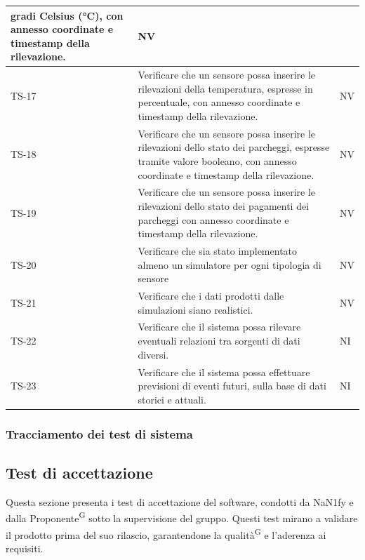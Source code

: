 \documentclass[8pt]{article}
\newcommand{\glossterm}[1]{#1\textsuperscript{G}} %
\begin{document}
\begin{longtable}{|>{\centering}p{2cm}|>{\RaggedRight}m{12cm}|>{\centering\arraybackslash}p{2cm}|}
    gradi Celsius (°C), con annesso coordinate e timestamp della rilevazione. & NV \\
    \hline
    TS-17 & Verificare che un sensore possa inserire le rilevazioni della temperatura, espresse in
    percentuale, con annesso coordinate e timestamp della rilevazione. & NV \\
    \hline 
    TS-18 & Verificare che un sensore possa inserire le rilevazioni dello stato dei parcheggi,
    espresse tramite valore booleano, con annesso coordinate e timestamp della rilevazione. & NV \\
    \hline 
    TS-19 & Verificare che un sensore possa inserire le rilevazioni dello stato dei pagamenti
    dei parcheggi con annesso coordinate e timestamp della rilevazione. & NV \\
    \hline
    TS-20 & Verificare che sia stato implementato almeno un simulatore per ogni tipologia di sensore
    & NV \\
    \hline
    TS-21 & Verificare che i dati prodotti dalle simulazioni siano realistici. & NV \\
    \hline
    TS-22 & Verificare che il sistema possa rilevare eventuali relazioni tra sorgenti di dati
    diversi. & NI \\
    \hline
    TS-23 & Verificare che il sistema possa effettuare previsioni di eventi futuri, sulla base di dati storici e attuali. & NI \\
    \hline
\end{longtable}
\subsubsection{Tracciamento dei test di sistema}
\subsection{Test di accettazione}
Questa sezione presenta i test di accettazione del software, condotti da NaN1fy e dalla
\glossterm{Proponente} sotto la supervisione del gruppo. Questi test mirano a validare il prodotto prima del suo rilascio, garantendone la \glossterm{qualità} e l'aderenza ai requisiti.
\end{document}
